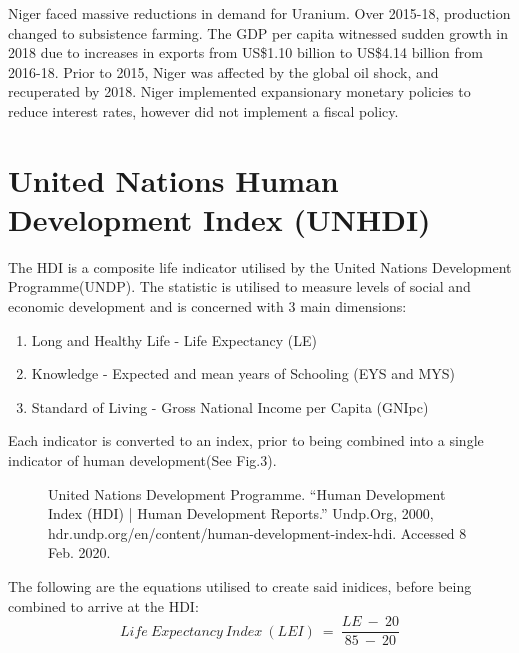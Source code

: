\documentclass[11pt, a4paper]{article}
\begin{document}
				Niger faced massive reductions in demand for Uranium. Over 2015-18, production changed to subsistence farming. The GDP per capita witnessed sudden growth in 2018 due to increases in exports from US\$1.10 billion to US\$4.14 billion from 2016-18. Prior to 2015, Niger was affected by the global oil shock, and recuperated by 2018. Niger implemented expansionary monetary policies to reduce interest rates, however did not implement a fiscal policy.

\singlespacing
	\vspace*{-6mm}
	\section{United Nations Human Development Index (UNHDI)}
\doublespacing
		\vspace*{-4mm}
		The HDI is a composite life indicator utilised by the United Nations Development Programme(UNDP). The statistic is utilised to measure levels of social and economic development and is concerned with 3 main dimensions:

		\vspace*{-3mm}
		\singlespacing
		\begin{enumerate}
			\item Long and Healthy Life - Life Expectancy (LE)
			\item Knowledge - Expected and mean years of Schooling (EYS and MYS)
			\item Standard of Living - Gross National Income per Capita (GNIpc)
		\end{enumerate}
		\doublespacing
		\vspace*{-3mm}
		
		Each indicator is converted to an index, prior to being combined into a single indicator of human development(See Fig.3). 
		
		\begin{figure}[H]
			\centering
			
			\caption{United Nations Development Programme. “Human Development Index (HDI) | Human Development Reports.” Undp.Org, 2000, hdr.undp.org/en/content/human-development-index-hdi. Accessed 8 Feb. 2020.}
		\end{figure}
		
		The following are the equations utilised to create said inidices, before being combined to arrive at the HDI:
		\singlespacing
		\begin{equation}
			Life \ Expectancy \ Index \ (LEI) \ = \ \frac{LE \ - \ 20}{85 \ - \ 20}
		\end{equation}
\end{document}
